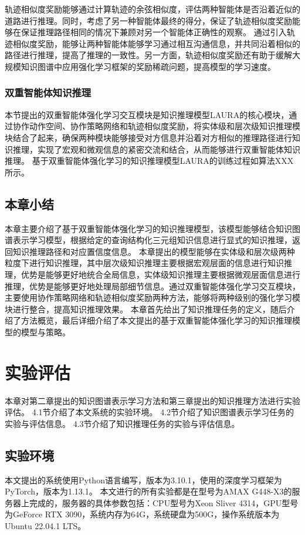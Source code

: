 \documentclass[algorithmlist, AutoFakeBold, AutoFakeSlant, figurelist, tablelist, nomlist, masters]{seuthesix}
\begin{document}
轨迹相似度奖励能够通过计算轨迹的余弦相似度，评估两种智能体是否沿着近似的道路进行推理。同时，考虑了另一种智能体最终的得分，保证了轨迹相似度奖励能够在保证推理路径相同的情况下兼顾对另一个智能体正确性的观察。
通过引入轨迹相似度奖励，能够让两种智能体能够学习通过相互沟通信息，并共同沿着相似的路径进行推理，提高了推理的一致性。另一方面，轨迹相似度奖励还有助于缓解大规模知识图谱中应用强化学习框架的奖励稀疏问题，提高模型的学习速度。

\subsection{双重智能体知识推理}
本节提出的双重智能体强化学习交互模块是知识推理模型LAURA的核心模块，通过协作动作空间、协作策略网络和轨迹相似度奖励，将实体级和层次级知识推理模块结合了起来，确保两种模块能够接受对方信息并沿着对方相似的推理路径进行知识推理，实现了宏观和微观信息的紧密交流和结合，从而能够进行双重智能体知识推理。
基于双重智能体强化学习的知识推理模型LAURA的训练过程如算法XXX所示。

\section{本章小结}
本章主要介绍了基于双重智能体强化学习的知识推理模型，该模型能够结合知识图谱表示学习模型，根据给定的查询结构化三元组知识信息进行显式的知识推理，返回知识推理路径和对应置信度信息。
本章提出的模型能够在实体级和层次级两种粒度下进行知识推理，其中层次级知识推理主要根据宏观层面的信息进行知识推理，优势是能够更好地统合全局信息，实体级知识推理主要根据微观层面信息进行推理，优势是能够更好地处理局部细节信息。通过双重智能体强化学习交互模块，主要使用协作策略网络和轨迹相似度奖励两种方法，能够将两种级别的强化学习模块进行整合，提高知识推理效果。
本章首先给出了知识推理任务的定义，随后介绍了方法概览，最后详细介绍了本文提出的基于双重智能体强化学习的知识推理模型的模型与策略。


\chapter{实验评估}
本章对第二章提出的知识图谱表示学习方法和第三章提出的知识推理方法进行实验评估。
4.1节介绍了本文系统的实验环境。
4.2节介绍了知识图谱表示学习任务的实验与评估信息。
4.3节介绍了知识推理任务的实验与评估信息。

\section{实验环境}
本文提出的系统使用Python语言编写，版本为3.10.1，使用的深度学习框架为PyTorch，版本为1.13.1。
本文进行的所有实验都是在型号为AMAX G448-X3的服务器上完成的，服务器的具体参数包括：CPU型号为Xeon Sliver 4314，GPU型号为GeForce RTX 3090，系统内存为64G，系统硬盘为500G，操作系统版本为Ubuntu 22.04.1 LTS。
\end{document}
